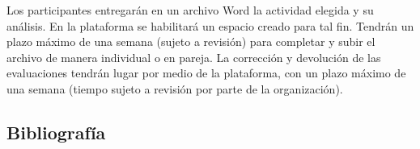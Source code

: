 Los participantes entregarán en un archivo Word la actividad elegida y su análisis. En la plataforma se habilitará un espacio creado para tal fin. Tendrán un plazo máximo de una semana (sujeto a revisión) para completar y subir el archivo de manera individual o en pareja. La corrección y devolución de las evaluaciones tendrán lugar por medio de la plataforma, con un plazo máximo de una semana (tiempo sujeto a revisión por parte de la organización).

\subsection{Bibliografía}

\nocite{*}
\printbibliography[keyword={06}]